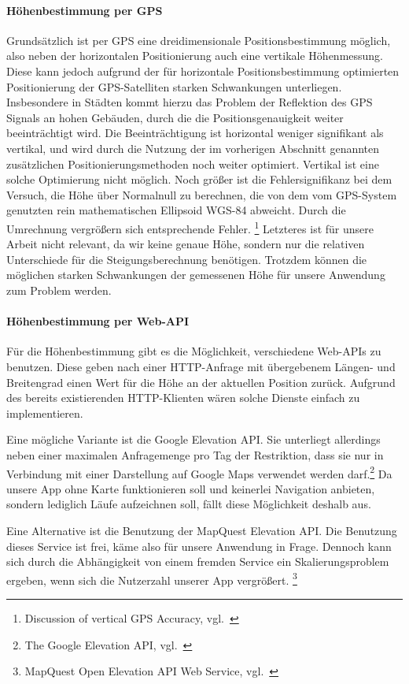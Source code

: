 \paragraph{Höhenbestimmung per GPS}
Grundsätzlich ist per GPS eine dreidimensionale Positionsbestimmung möglich, also neben der horizontalen Positionierung auch eine vertikale Höhenmessung. Diese kann jedoch aufgrund der für horizontale Positionsbestimmung optimierten Positionierung der GPS-Satelliten starken Schwankungen unterliegen. Insbesondere in Städten kommt hierzu das Problem der Reflektion des GPS Signals an hohen Gebäuden, durch die die Positionsgenauigkeit weiter beeinträchtigt wird. Die Beeinträchtigung ist horizontal weniger signifikant als vertikal, und wird durch die Nutzung der im vorherigen Abschnitt genannten zusätzlichen Positionierungsmethoden noch weiter optimiert. Vertikal ist eine solche Optimierung nicht möglich. Noch größer ist die Fehlersignifikanz bei dem Versuch, die Höhe über Normalnull zu berechnen, die von dem vom GPS-System genutzten rein mathematischen Ellipsoid WGS-84 abweicht. Durch die Umrechnung vergrößern sich entsprechende Fehler. \footnote{Discussion of vertical GPS Accuracy, vgl.~\cite{gladstone}} Letzteres ist für unsere Arbeit nicht relevant, da wir keine genaue Höhe, sondern nur die relativen Unterschiede für die Steigungsberechnung benötigen. Trotzdem können die möglichen starken Schwankungen der gemessenen Höhe für unsere Anwendung zum Problem werden.
\paragraph{Höhenbestimmung per Web-API}
Für die Höhenbestimmung gibt es die Möglichkeit, verschiedene Web-APIs zu benutzen. Diese geben nach einer HTTP-Anfrage mit übergebenem Längen- und Breitengrad einen Wert für die Höhe an der aktuellen Position zurück. Aufgrund des bereits existierenden HTTP-Klienten wären solche Dienste einfach zu implementieren.

Eine mögliche Variante ist die Google Elevation API. Sie unterliegt allerdings neben einer maximalen Anfragemenge pro Tag der Restriktion, dass sie nur in Verbindung mit einer Darstellung auf Google Maps verwendet werden darf.\footnote{The Google Elevation API, vgl.~\cite{googleelevation}}  Da unsere App ohne Karte funktionieren soll und keinerlei Navigation anbieten, sondern lediglich Läufe aufzeichnen soll, fällt diese Möglichkeit deshalb aus.

Eine Alternative ist die Benutzung der MapQuest Elevation API. Die Benutzung dieses Service ist frei, käme also für unsere Anwendung in Frage. Dennoch kann sich durch die Abhängigkeit von einem fremden Service ein Skalierungsproblem ergeben, wenn sich die Nutzerzahl unserer App vergrößert. \footnote{MapQuest Open Elevation API Web Service, vgl.~\cite{mapquest}}

